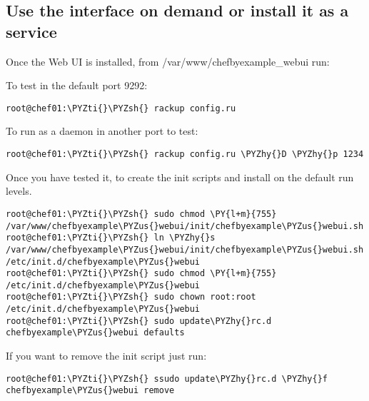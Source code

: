 \subsection{Use the interface on demand or install it as a service}

Once the Web UI is installed, from /var/www/chefbyexample\_webui run:

To test in the default port 9292:
\begin{codelisting}
\label{code:}
\codecaption{}
\begin{Verbatim}[fontsize=\relsize{-2.5},fontseries=b,commandchars=\\\{\}]
root@chef01:\PYZti{}\PYZsh{} rackup config.ru
\end{Verbatim}
\end{codelisting}

To run as a daemon in another port to test:

\begin{codelisting}
\label{code:}
\codecaption{}
\begin{Verbatim}[fontsize=\relsize{-2.5},fontseries=b,commandchars=\\\{\}]
root@chef01:\PYZti{}\PYZsh{} rackup config.ru \PYZhy{}D \PYZhy{}p 1234
\end{Verbatim}
\end{codelisting}

Once you have tested it, to create the init scripts and install on the default run levels.

\begin{codelisting}
\label{code:}
\codecaption{}
\begin{Verbatim}[fontsize=\relsize{-2.5},fontseries=b,commandchars=\\\{\}]
root@chef01:\PYZti{}\PYZsh{} sudo chmod \PY{l+m}{755} /var/www/chefbyexample\PYZus{}webui/init/chefbyexample\PYZus{}webui.sh
root@chef01:\PYZti{}\PYZsh{} ln \PYZhy{}s /var/www/chefbyexample\PYZus{}webui/init/chefbyexample\PYZus{}webui.sh /etc/init.d/chefbyexample\PYZus{}webui
root@chef01:\PYZti{}\PYZsh{} sudo chmod \PY{l+m}{755} /etc/init.d/chefbyexample\PYZus{}webui
root@chef01:\PYZti{}\PYZsh{} sudo chown root:root /etc/init.d/chefbyexample\PYZus{}webui
root@chef01:\PYZti{}\PYZsh{} sudo update\PYZhy{}rc.d chefbyexample\PYZus{}webui defaults
\end{Verbatim}
\end{codelisting}

If you want to remove the init script just run:

\begin{codelisting}
\label{code:}
\codecaption{}
\begin{Verbatim}[fontsize=\relsize{-2.5},fontseries=b,commandchars=\\\{\}]
root@chef01:\PYZti{}\PYZsh{} ssudo update\PYZhy{}rc.d \PYZhy{}f chefbyexample\PYZus{}webui remove
\end{Verbatim}
\end{codelisting}